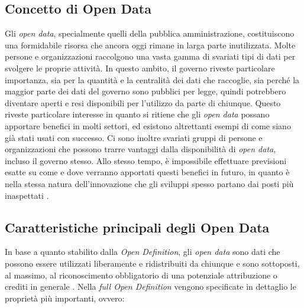 \subsection{Concetto di Open Data}
Gli \textit{open data}, specialmente quelli della pubblica amministrazione, costituiscono una formidabile risorsa che ancora oggi rimane in larga parte inutilizzata. Molte persone e organizzazioni raccolgono una vasta gamma di svariati tipi di dati per svolgere le proprie attività. In questo ambito, il governo riveste particolare importanza, sia per la quantità e la centralità dei dati che raccoglie, sia perché la maggior parte dei dati del governo sono pubblici per legge, quindi potrebbero diventare aperti e resi disponibili per l'utilizzo da parte di chiunque. Questo riveste particolare interesse in quanto si ritiene che gli \textit{open data} possano apportare benefici in molti settori, ed esistono altrettanti esempi di come siano già stati usati con successo. Ci sono inoltre svariati gruppi di persone e organizzazioni che possono trarre vantaggi dalla disponibilità di \textit{open data}, incluso il governo stesso. Allo stesso tempo, è impossibile effettuare previsioni esatte su come e dove verranno apportati questi benefici in futuro, in quanto è nella stessa natura dell'innovazione che gli sviluppi spesso partano dai posti più inaspettati \cite{OpenDataHandbook_WhyOpenData}.

\subsection{Caratteristiche principali degli Open Data}
In base a quanto stabilito dalla \textit{Open Definition}, gli \textit{open data} sono dati che possono essere utilizzati liberamente e ridistribuiti da chiunque e sono sottoposti, al massimo, al riconoscimento obbligatorio di una potenziale attribuzione o crediti in generale \cite{OpenDefinition}. Nella \textit{full Open Definition} vengono specificate in dettaglio le proprietà più importanti, ovvero:

